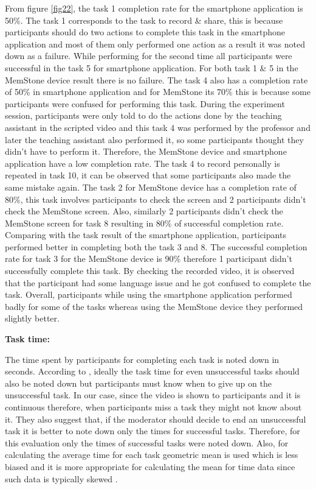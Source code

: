 \documentclass[mscthesis]{usiinfthesis}
\begin{document}
From figure \ref{fig22}, the task 1 completion rate for the smartphone application is 50\%. The task 1 corresponds to the task to record \& share, this is because participants should do two actions to complete this task in the smartphone application and most of them only performed one action as a result it was noted down as a failure. While performing for the second time all participants were successful in the task 5 for smartphone application. For both task 1 \& 5 in the MemStone device result there is no failure. The task 4 also has a completion rate of 50\% in smartphone application and for MemStone its 70\% this is because some participants were confused for performing this task. During the experiment session, participants were only told to do the actions done by the teaching assistant in the scripted video and this task 4 was performed by the professor and later the teaching assistant also performed it, so some participants thought they didn't have to perform it. Therefore, the MemStone device and smartphone application have a low completion rate. The task 4 to record personally is repeated in task 10, it can be observed that some participants also made the same mistake again. The task 2 for MemStone device has a completion rate of 80\%, this task involves participants to check the screen and 2 participants didn't check the MemStone screen. Also, similarly 2 participants didn't check the MemStone screen for task 8 resulting in 80\% of successful completion rate. Comparing with the task result of the smartphone application, participants performed better in completing both the task 3 and 8. The successful completion rate for task 3 for the MemStone device is 90\% therefore 1 participant didn't successfully complete this task. By checking the recorded video, it is observed that the participant had some language issue and he got confused to complete the task. Overall, participants while using the smartphone application performed badly for some of the tasks whereas using the MemStone device they performed slightly better. 
\newline

\textbf{Task time:}

The time spent by participants for completing each task is noted down in seconds. According to \citeauthor{albert2013measuring}, ideally the task time for even unsuccessful tasks should also be noted down but participants must know when to give up on the unsuccessful task. In our case, since the video is shown to participants and it is continuous therefore, when participants miss a task they might not know about it. They also suggest that, if the moderator should decide to end an unsuccessful task it is better to note down only the times for successful tasks. Therefore, for this evaluation only the times of successful tasks were noted down. Also, for calculating the average time for each task geometric mean is used which is less biased and it is more appropriate for calculating the mean for time data since such data is typically skewed \citep{albert2013measuring}. 
\end{document}
